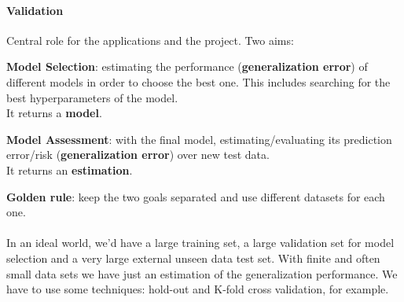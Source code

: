 \documentclass[10pt]{report}
\begin{document}
\paragraph{Validation} Central role for the applications and the project. Two aims:
\begin{list}{}{}
	\item \textbf{Model Selection}: estimating the performance (\textbf{generalization error}) of different models in order to choose the best one. This includes searching for the best hyperparameters of the model.\\
	It returns a \textbf{model}.
	\item \textbf{Model Assessment}: with the final model, estimating/evaluating its prediction error/risk (\textbf{generalization error}) over new test data.\\
	It returns an \textbf{estimation}.
\end{list}
\textbf{Golden rule}: keep the two goals separated and use different datasets for each one.\\\\
In an ideal world, we'd have a large training set, a large validation set for model selection and a very large external unseen data test set. With finite and often small data sets we have just an estimation of the generalization performance. We have to use some techniques: hold-out and K-fold cross validation, for example.
\end{document}
